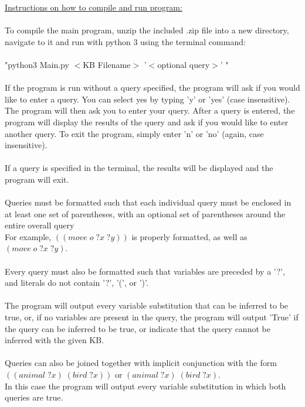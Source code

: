 \documentclass[12pt]{letter}
\begin{document}
\vspace*{-10mm}

{\large \noindent
\underline{Instructions on how to compile and run program:}} \\
\\
To compile the main program, unzip the included .zip file into a new directory, \\
navigate to it and run with python 3 using the terminal command: \\
\\
"python3\;  Main.py\;   $<$KB Filename$>$\;   '$<$optional query$>$' " \\
\\
If the program is run without a query specified, the program will ask if you would like to enter a query. 
You can select yes by typing 'y' or 'yes' (case insensitive). The program will then ask you to enter
your query. After a query is entered, the program will display the results of the query and 
ask if you would like to enter another query. To exit the program, simply enter 'n' or 'no' 
(again, case insensitive). \\
\\
If a query is specified in the terminal, the results will be displayed and the program will exit. \\
\\
Queries must be formatted such that each individual query must be enclosed in at least one set of parentheses, with an optional set of parentheses around the entire overall query \\
For example, $((move\;o\;?x\;?y))$ is properly formatted, as well as $(move\;o\;?x \;?y)$. \\
\\
Every query must also be formatted such that variables are preceded by a '?', and literals do not contain '?', '(', or ')'. \\
\\
The program will output every variable substitution that can be inferred to be true, or, if no variables are present in the query, 
the program will output 'True' if the query can be inferred to be true, or indicate that the query cannot be inferred with the given KB. \\
\\
Queries can also be joined together with implicit conjunction with the form $((animal\;?x)\;(bird\;?x))$ or $(animal\;?x)\;(bird\;?x)$. \\
In this case the program will output every variable substitution in which both queries are true. \\
\end{document}
